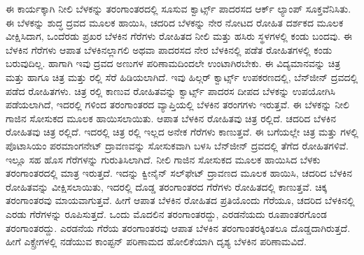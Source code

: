 ಈ ಕಾರ್ಯಕ್ಕಾಗಿ ನೀಲಿ ಬೆಳಕನ್ನು  ತರಂಗಾಂತರದಲ್ಲಿ ಸೂಸುವ ಕ್ವಾರ್ಟ್ಸ್ ಪಾದರಸದ ಆರ್ಕ್ ಲ್ಯಾಂಪ್ ಸೂಕ್ತವೆನಿಸಿತು. ಈ ಬೆಳಕನ್ನು ಶುದ್ಧ ದ್ರವದ ಮೂಲಕ ಹಾಯಿಸಿ, ಚದರಿದ ಬೆಳಕನ್ನು ನೇರ ನೋಟದ ರೋಹಿತ ದರ್ಶಕದ ಮೂಲಕ ವೀಕ್ಷಿಸಿದಾಗ, ಒಂದೆರಡು ಪ್ರಖರ ಬೆಳಕಿನ ಗೆರೆಗಳು ರೋಹಿತದ ನೀಲಿ ಮತ್ತು ಹಸಿರು ಸ್ಥಳಗಳಲ್ಲಿ ಕಂಡು ಬಂದವು. ಈ ಬೆಳಕಿನ ಗೆರೆಗಳು ಆಪಾತ ಬೆಳಕಿನಲ್ಲಾಗಲಿ ಅಥವಾ ಪಾದರಸದ ನೇರ ಬೆಳಕಿನಲ್ಲಿ ಪಡೆತ ರೋಹಿತಗಳಲ್ಲಿ ಕಂಡು ಬರುವುದಿಲ್ಲ. ಹಾಗಾಗಿ ಇವು ದ್ರವದ ಅಣುಗಳ ಪರಿಣಾಮದಿಂದಲೇ ಉಂಟಾಗಿರಬೇಕು. ಈ ವಿದ್ಯಮಾನವನ್ನು ಚಿತ್ರ  ಮತ್ತು  ಹಾಗೂ ಚಿತ್ರ  ಮತ್ತು ರಲ್ಲಿ ಸೆರೆ ಹಿಡಿಯಲಾಗಿದೆ. ಇವು ಹಿಲ್ಗರ್ ಕ್ವಾರ್ಟ್ಸ್ ಉಪಕರಣದಲ್ಲಿ, ಬೆನ್‍ಜೀನ್ ದ್ರವದಲ್ಲಿ ಪಡೆದ ರೋಹಿತಗಳು. ಚಿತ್ರ ರಲ್ಲಿ ಕಾಣುವ ರೋಹಿತವನ್ನು ಕ್ವಾರ್ಟ್ಸ್ ಪಾದರಸ ದೀಪದ ಬೆಳಕನ್ನು ಉಪಯೋಗಿಸಿ ಪಡೆಯಲಾಗಿದೆ, ಇದರಲ್ಲಿ  ಗಳಿಂದ  ತರಂಗಾಂತರದ ವ್ಯಾಪ್ತಿಯಲ್ಲಿ ಬೆಳಕಿನ ತರಂಗಗಳು ಇರುತ್ತವೆ. ಈ ಬೆಳಕನ್ನು ನೀಲಿ ಗಾಜಿನ ಸೋಸುಕದ ಮೂಲಕ ಹಾಯಿಸಲಾಯಿತು. ಆಪಾತ ಬೆಳಕಿನ ರೋಹಿತವು ಚಿತ್ರ ರಲ್ಲಿದೆ. ಚದರಿದ ಬೆಳಕಿನ ರೋಹಿತವು ಚಿತ್ರ ರಲ್ಲಿದೆ. ಇದರಲ್ಲಿ ಚಿತ್ರ ರಲ್ಲಿ ಇಲ್ಲದ ಅನೇಕ ಗೆರೆಗಳು ಕಾಣುತ್ತವೆ. ಈ ಬಗೆಯಲ್ಲೇ ಚಿತ್ರ  ಮತ್ತು  ಗಳಲ್ಲಿ ಪೊಟಾಸಿಯಂ ಪರಮಾಂಗನೇಟ್ ದ್ರಾವಣವನ್ನು ಸೋಸುಕವಾಗಿ ಬಳಸಿ ಬೆನ್‍ಜೀನ್ ದ್ರವದಲ್ಲಿ ತೆಗೆದ ರೋಹಿತಗಳಿವೆ. ಇಲ್ಲೂ ಸಹ ಹೊಸ ಗೆರೆಗಳನ್ನು ಗುರುತಿಸಿಲಾಗಿದೆ. ನೀಲಿ ಗಾಜಿನ ಸೋಸುಕದ ಮೂಲಕ ಹಾಯಿಸಿದ ಬೆಳಕು  ತರಂಗಾಂತರದಲ್ಲಿ ಮಾತ್ರ ಇರುತ್ತದೆ. ಇದನ್ನು ಕ್ವೀನೈನ್ ಸಲ್‌ಫೇಟ್ ದ್ರಾವಣದ ಮೂಲಕ ಹಾಯಿಸಿ, ಚದರಿದ ಬೆಳಕಿನ ರೋಹಿತವನ್ನು ವೀಕ್ಷಿಸಲಾಯಿತು, ಇದರಲ್ಲಿ ದೊಡ್ಡ ತರಂಗಾಂತರದ ಗೆರೆಗಳು ರೋಹಿತದಲ್ಲಿ ಕಾಣುತ್ತವೆ. ಚಿಕ್ಕ ತರಂಗಾಂತರವು ಮಾಯವಾಗುತ್ತವೆ. ಹೀಗೆ ಆಪಾತ ಬೆಳಕಿನ ರೋಹಿತದ ಪ್ರತಿಯೊಂದು ಗೆರೆಯೂ, ಚದರಿದ ಬೆಳಕಿನಲ್ಲಿ ಎರಡು ಗೆರೆಗಳನ್ನು ರೂಪಿಸುತ್ತದೆ. ಒಂದು ಮೊದಲಿನ ತರಂಗಾಂತರದ್ದು, ಎರಡನೆಯದು ರೂಪಾಂತರಗೊಂಡ ತರಂಗಾಂತರದ್ದು. ಎರಡನೆಯ ಗೆರೆಯ ತರಂಗಾಂತರವು ಆಪಾತ ಬೆಳಕಿನ ತರಂಗಾಂತರಕ್ಕಿಂತಲೂ ದೊಡ್ಡದಾಗಿರುತ್ತದೆ. ಹೀಗೆ ಎಕ್ಸ್\enginline{-}ರೇಗಳಲ್ಲಿ ನಡೆಯುವ ಕಾಂಪ್ಟನ್ ಪರಿಣಾಮದ ಹೋಲಿಕೆಯಾಗಿ ದೃಶ್ಯ ಬೆಳಕಿನ ಪರಿಣಾಮವಿದೆ.

\vskip -5pt

